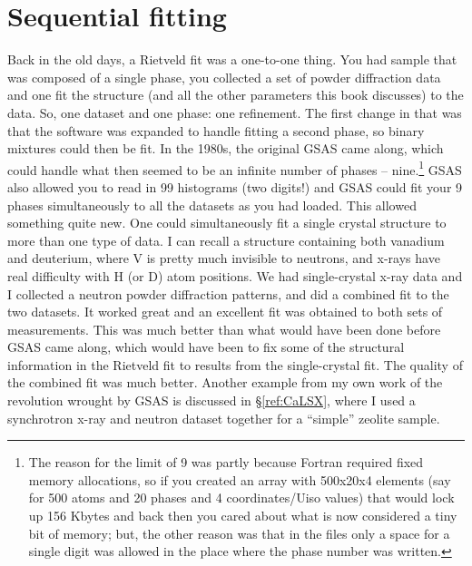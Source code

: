\chapter{Sequential fitting}\label{Chap:Sequential}

Back in the old days, a Rietveld fit was a one-to-one thing. You had sample that was composed of a single phase, you collected a set of powder diffraction data and one fit the structure (and all the other parameters this book discusses) to the data. So, one dataset and one phase: one refinement. The first change in that was that the software was expanded to handle fitting a second phase, so binary mixtures could then be fit. In the 1980s, the original GSAS came along, which could handle what then seemed to be an infinite number of phases -- nine.\footnote{The reason for the limit of 9 was partly because Fortran required fixed memory allocations, so if you created an array with 500x20x4 elements (say for 500 atoms and 20 phases and 4 coordinates/Uiso values) that would lock up 156 Kbytes and back then you cared about what is now considered a tiny bit of memory; but, the other reason was that in the files only a space for a single digit was allowed in the place where the phase number was written.} GSAS also allowed you to read in 99 histograms (two digits!) and GSAS could fit your 9 phases simultaneously to all the datasets as you had loaded. This allowed something quite new. One could simultaneously fit a single crystal structure to more than one type of data. I can recall a structure containing both vanadium and deuterium, where V is pretty much invisible to neutrons, and x-rays have real difficulty with H (or D) atom positions. We had single-crystal x-ray data and I collected a neutron powder diffraction patterns, and did a combined fit to the two datasets. It worked great and an excellent fit was obtained to both sets of measurements. This was much better than what would have been done before GSAS came along, which would have been to fix some of the structural information in the Rietveld fit to results from the single-crystal fit. The quality of the combined fit was much better. Another example from my own work of the revolution wrought by GSAS is discussed in \S\ref{ref:CaLSX}, where I used a synchrotron x-ray and neutron dataset together for a ``simple'' zeolite sample. 

